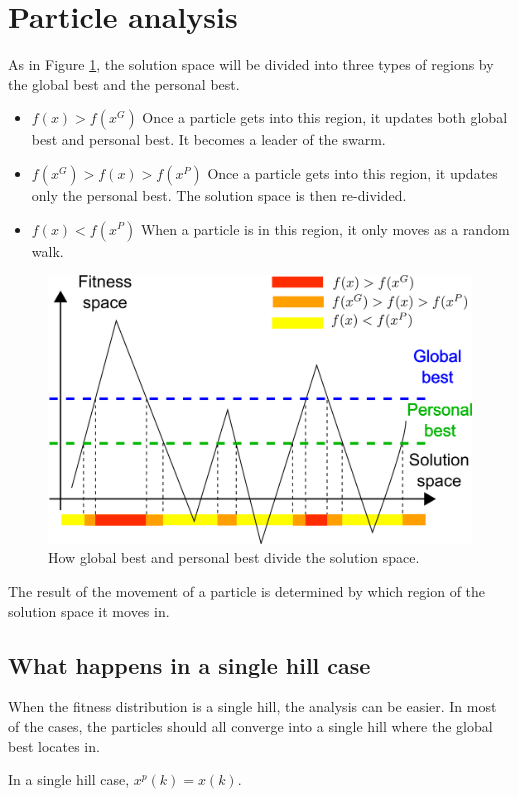 \section{Particle analysis}
\label{sec:particle}

As in Figure \ref{fig:categorize_regions}, the solution space will be divided into three types of regions by the global best and the personal best.
\begin{itemize}
\item $ f(x) > f(x^G) $
Once a particle gets into this region, it updates both global best and personal best. 
It becomes a leader of the swarm.
\item $ f(x^{G}) > f(x) > f(x^{P}) $
Once a particle gets into this region, it updates only the personal best.
The solution space is then re-divided.
\item $ f(x) < f(x^{P}) $
When a particle is in this region, it only moves as a random walk.
\end{itemize}

\begin{figure}
\centering
\includegraphics[width=0.7\linewidth]{./fig/categorize_regions}
\caption{How global best and personal best divide the solution space.}
\label{fig:categorize_regions}
\end{figure}

The result of the movement of a particle is determined by which region of the solution space it moves in.

\subsection{What happens in a single hill case}

When the fitness distribution is a single hill, the analysis can be easier.
In most of the cases, the particles should all converge into a single hill where the global best locates in.

\begin{myprop}
In a single hill case, $ x^{p}(k) = x(k) $. 
\end{myprop}


